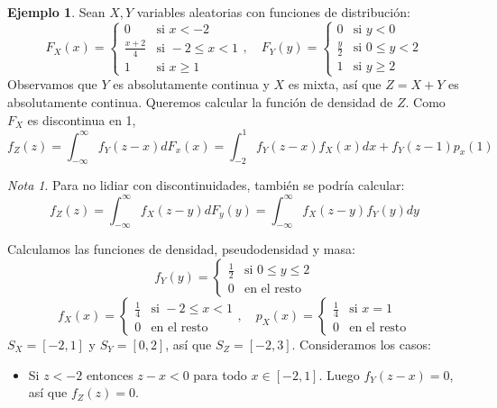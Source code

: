 \documentclass{report}
\theoremstyle{remark}
\theoremstyle{remark}
\newtheorem*{note}{Nota}
\theoremstyle{remark}
\theoremstyle{definition}
\theoremstyle{definition}
\theoremstyle{definition}
\newtheorem*{example}{Ejemplo}
\theoremstyle{definition}
\begin{document}
\begin{example}
    Sean $X, Y$ variables aleatorias con funciones de distribución:
    $$F_X(x) = \begin{cases}
            0             & \text{si } x < -2        \\
            \frac{x+2}{4} & \text{si } -2 \leq x < 1 \\
            1             & \text{si } x \geq 1
        \end{cases}, \quad
        F_Y(y) = \begin{cases}
            0           & \text{si } y < 0        \\
            \frac{y}{2} & \text{si } 0 \leq y < 2 \\
            1           & \text{si } y \geq 2
        \end{cases}$$
    Observamos que $Y$ es absolutamente continua y $X$ es mixta, así que $Z = X+Y$ es absolutamente continua.
    Queremos calcular la función de densidad de $Z$.
    Como $F_X$ es discontinua en 1,
    $$f_Z(z) = \int_{-\infty}^\infty f_Y(z-x) dF_x(x) = \int_{-2}^1 f_Y(z-x) f_X(x) dx + f_Y(z-1)p_x(1)$$
    \begin{note}
        Para no lidiar con discontinuidades, también se podría calcular:
        $$f_Z(z) = \int_{-\infty}^\infty f_X(z-y) dF_y(y) = \int_{-\infty}^\infty f_X(z-y) f_Y(y) dy$$
    \end{note}
    Calculamos las funciones de densidad, pseudodensidad y masa:
    $$f_Y(y) = \begin{cases}
            \frac{1}{2} & \text{si } 0 \leq y \leq 2 \\
            0           & \text{en el resto}
        \end{cases}$$
    $$f_X(x) = \begin{cases}
            \frac{1}{4} & \text{si } -2 \leq x < 1 \\
            0           & \text{en el resto}
        \end{cases}, \quad
        p_X(x) = \begin{cases}
            \frac{1}{4} & \text{si } x = 1   \\
            0           & \text{en el resto}
        \end{cases}$$
    $S_X = [-2, 1]$ y $S_Y = [0, 2]$, así que $S_Z = [-2, 3]$.
    Consideramos los casos:
    \begin{itemize}
        \item Si $z < -2$ entonces $z-x < 0$ para todo $x \in [-2, 1]$.
              Luego $f_Y(z-x) = 0$, así que $f_Z(z) = 0$.

\end{itemize}
\end{example}
\end{document}
